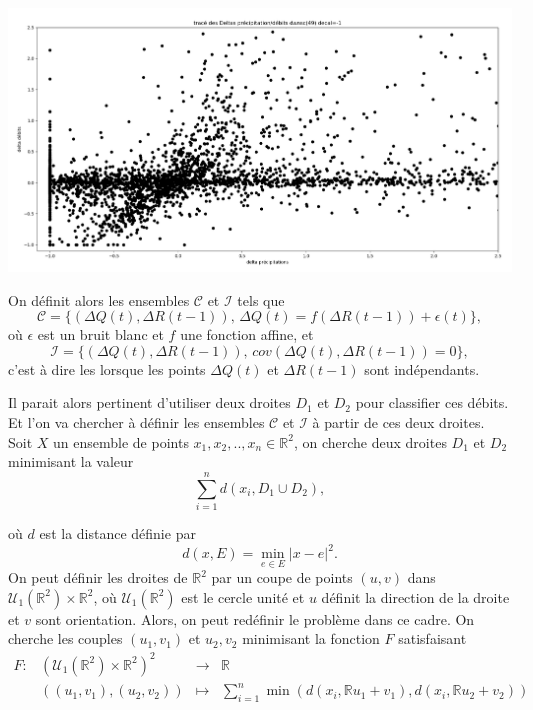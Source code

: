 \documentclass[a4paper,11pt]{article}
\begin{document}
\begin{center}
	\captionsetup{type=figure}
	\includegraphics[scale=0.28]{images/deb_prec_dec1.png}
\end{center}
On définit alors les ensembles $\mathcal{C}$ et $\mathcal{I}$ tels que
\[\mathcal{C}=\{(\Delta Q(t),\Delta R(t-1)), \, \Delta Q(t)= f(\Delta R(t-1))+\epsilon(t)\},\]
où $\epsilon$ est un bruit blanc et $f$ une fonction affine, et
\[\mathcal{I}= \{(\Delta Q(t),\Delta R(t-1)), \, cov(\Delta Q(t),\Delta R(t-1))=0\},\]
c'est à dire les lorsque les points $\Delta Q(t)$ et $\Delta R(t-1)$ sont indépendants.  

Il parait alors pertinent d'utiliser deux droites $D_1$ et $D_2$ pour classifier ces débits. Et l'on va chercher à définir les ensembles $\mathcal{C}$ et $\mathcal{I}$ à partir de ces deux droites.
Soit $X$ un ensemble de points  $x_1, x_2, .., x_n \in \mathbb{R}^2$, on cherche deux droites $D_1$ et $D_2$ minimisant la valeur
\[\sum_{i=1}^{n}d(x_i, D_1 \cup D_2),\]

où $d$ est la distance définie par 
\[d(x,E)= \min_{e \in E} |x-e|^2.\]
On peut définir les droites de $\mathbb{R}^2$ par un coupe de points $(u,v)$ dans $\mathcal{U}_1(\mathbb{R}^2)\times\mathbb{R}^2$, où $\mathcal{U}_1(\mathbb{R}^2)$ est le cercle unité et $u$ définit la direction de la droite et $v$ sont orientation. Alors, on peut redéfinir le problème dans ce cadre. On cherche les couples $(u_1,v_1)$ et $u_2,v_2$ minimisant la fonction $F$ satisfaisant 
\begin{equation}
	\label{F}
	\begin{array}{cccc}
		F: & (\mathcal{U}_1(\mathbb{R}^2)\times\mathbb{R}^2)^2 &\to &\mathbb{R}\\
		& ((u_1,v_1), (u_2,v_2)) & \mapsto & \sum_{i=1}^{n}\min (d(x_i,\mathbb{R}u_1+v_1), d(x_i,\mathbb{R}u_2+v_2))
	\end{array}
\end{equation}
\end{document}
